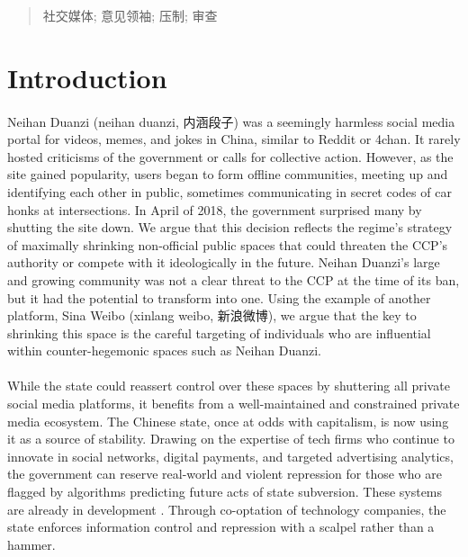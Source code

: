 \documentclass[12pt]{article}
\begin{document}
\begin{CJK*}{UTF8}{gbsn}
{\begin{abstract}
 社交媒体; 意见领袖; 压制; 审查
\end{abstract}
}
\newpage

\section*{Introduction}

\paragraph{} Neihan Duanzi (neihan duanzi, 内涵段子) was a seemingly harmless social media portal for videos, memes, and jokes in China, similar to Reddit or 4chan. It rarely hosted criticisms of the government or calls for collective action. However, as the site gained popularity, users began to form offline communities, meeting up and identifying each other in public, sometimes communicating in secret codes of car honks at intersections. In April of 2018, the government surprised many by shutting the site down. We argue that this decision reflects the regime's strategy of maximally shrinking non-official public spaces that could threaten the CCP's authority or compete with it ideologically in the future. Neihan Duanzi's large and growing community was not a clear threat to the CCP at the time of its ban, but it had the potential to transform into one. Using the example of another platform, Sina Weibo (xinlang weibo, 新浪微博), we argue that the key to shrinking this space is the careful targeting of individuals who are influential within counter-hegemonic spaces such as Neihan Duanzi.

\paragraph{} While the state could reassert control over these spaces by shuttering all private social media platforms, it benefits from a well-maintained and constrained private media ecosystem. The Chinese state, once at odds with capitalism, is now using it as a source of stability. Drawing on the expertise of tech firms who continue to innovate in social networks, digital payments, and targeted advertising analytics, the government can reserve real-world and violent repression for those who are flagged by algorithms predicting future acts of state subversion. These systems are already in development \citep{merics2017social,yang2017social}. Through co-optation of technology companies, the state enforces information control and repression with a scalpel rather than a hammer. 


\end{CJK*}
\end{document}
